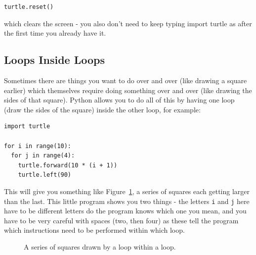 \documentclass[a4paper, 11pt]{book}
\begin{document}
{\small
\begin{verbatim}
turtle.reset()
\end{verbatim}
}

\noindent
which clears the screen - you also don't need to keep typing import
turtle as after the first time you already have it.

\subsection{Loops Inside Loops}

Sometimes there are things you want to do over and over (like drawing
a square earlier) which themselves require doing something over and
over (like drawing the sides of that square). Python allows you to do
all of this by having one loop (draw the sides of the square) inside
the other loop, for example:

{\small
\begin{verbatim}
import turtle

for i in range(10):
  for j in range(4):
    turtle.forward(10 * (i + 1))
    turtle.left(90)
\end{verbatim}
}

\noindent
This will give you something like
Figure~\ref{figure-loop-within-loop}, a series of squares each getting
larger than the last. This little program shows you two things - the
letters \verb|i| and \verb|j| here have to be different letters do the
program knows which one you mean, and you have to be very careful with
spaces (two, then four) as these tell the program which instructions
need to be performed within which loop.

\begin{figure}
\label{figure-loop-within-loop}
\centering
{}
\caption{A series of squares drawn by a loop within a loop.}
\end{figure}
\end{document}
